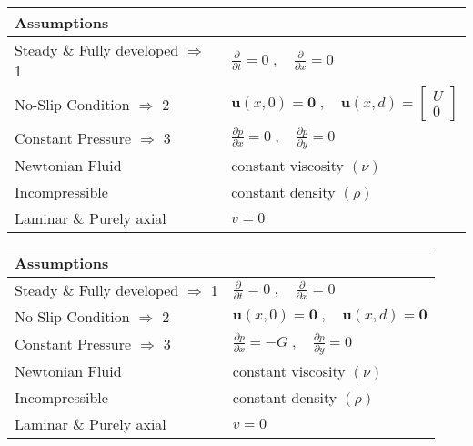 \documentclass[../main.tex]{subfiles}
\begin{document}
	
	\begin{tabular}{ |l| p{}| }
		\hline
		\multicolumn{2}{|l|}{\textbf{Assumptions}} \\
		\hline		
		Steady  \& Fully developed $\Rightarrow$ 1 & $\frac{\partial}{\partial t} = 0 \; , \quad \frac{\partial}{\partial x} = 0$ \\ 
		No-Slip Condition $\Rightarrow$ 2 & $\mathbf{u}(x,0) = \mathbf{0} \; , \quad \mathbf{u}(x,d) = \begin{bmatrix}
			U \\ 
			0
		\end{bmatrix}$\\
		Constant Pressure $\Rightarrow$ 3 & $\frac{\partial p}{\partial x} = 0 \; , \quad \frac{\partial p}{\partial y} = 0$\\
		\hline
		Newtonian Fluid & constant viscosity $(\nu)$\\
		Incompressible & constant density $(\rho)$ \\
		Laminar \& Purely axial & $v = 0$ \\
		\hline
	\end{tabular}
	\vspace{20pt}	
	
	\begin{tabular}{ |l| p{}| }
		\hline
		\multicolumn{2}{|l|}{\textbf{Assumptions}} \\
		\hline		
		Steady  \& Fully developed $\Rightarrow$ 1 & $\frac{\partial}{\partial t} = 0 \; , \quad \frac{\partial}{\partial x} = 0$ \\ 
		No-Slip Condition $\Rightarrow$ 2 & $\mathbf{u}(x,0) = \mathbf{0} \; , \quad \mathbf{u}(x,d) = \mathbf{0}$\\
		Constant Pressure $\Rightarrow$ 3 & $\frac{\partial p}{\partial x} = -G \; , \quad \frac{\partial p}{\partial y} = 0$\\
		\hline
		Newtonian Fluid & constant viscosity $(\nu)$\\
		Incompressible & constant density $(\rho)$ \\
		Laminar \& Purely axial & $v = 0$ \\
		\hline
	\end{tabular}
	\vspace{20pt}	
	
\end{document}
